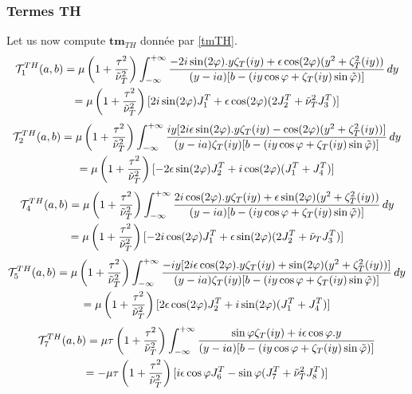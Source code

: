 \subsubsection{Termes TH}
Let us now compute $\mathbf{tm}_{TH}$ donnée par \eqref{tmTH}.
\begin{multline}
\mathcal{T}_1^{TH}(a,b)=\mu\left(1+\frac{\tau^2}{\nuti_T^2}\right)\int_{-\infty}^{+\infty} \frac{-2i\sin(2\varphi).y\zeta_T(iy)+\epsilon \cos (2\varphi)(y^2+\zeta_T^2(iy))}{(y-ia)\lbrack b-(iy\cos \varphi+ \zeta_T(iy)\sin\phiti) \rbrack} \, dy \\
\hfill=\mu\left(1+\frac{\tau^2}{\nuti_T^2}\right) \lbrack 2i\sin(2\varphi)J_1^T+\epsilon\cos(2\varphi)(2J_2^T+\nuti_T^2 J_3^T)\rbrack \hfill
\end{multline}
\begin{multline}
\mathcal{T}_2^{TH}(a,b)=\mu\left(1+\frac{\tau^2}{\nuti_T^2}\right)\int_{-\infty}^{+\infty} \frac{iy\lbrack 2i\epsilon \sin(2\varphi).y\zeta_T(iy)- \cos (2\varphi)(y^2+\zeta_T^2(iy))\rbrack}{(y-ia)\zeta_T(iy)\lbrack b-(iy\cos \varphi+ \zeta_T(iy)\sin\phiti) \rbrack} \, dy \\
\hfill= \mu\left(1+\frac{\tau^2}{\nuti_T^2}\right) \lbrack -2\epsilon\sin(2\varphi)J_2^T+i\cos(2\varphi)(J_1^T+J_4^T) \rbrack \hfill
\end{multline}
\begin{multline}
\mathcal{T}_4^{TH}(a,b)=\mu\left(1+\frac{\tau^2}{\nuti_T^2}\right)\int_{-\infty}^{+\infty} \frac{2i\cos(2\varphi).y\zeta_T(iy)+\epsilon \sin (2\varphi)(y^2+\zeta_T^2(iy))}{(y-ia)\lbrack b-(iy\cos \varphi+ \zeta_T(iy)\sin\phiti) \rbrack} \, dy \\
\hfill =\mu\left(1+\frac{\tau^2}{\nuti_T^2}\right) \lbrack -2i\cos(2\varphi)J_1^T+\epsilon \sin(2\varphi)(2J_2^T+\nuti_TJ_3^T) \rbrack \hfill
\end{multline}
\begin{multline}
\mathcal{T}_5^{TH}(a,b)=\mu\left(1+\frac{\tau^2}{\nuti_T^2}\right)\int_{-\infty}^{+\infty} \frac{-iy\lbrack 2i\epsilon \cos(2\varphi).y\zeta_T(iy)+\sin (2\varphi)(y^2+\zeta_T^2(iy))\rbrack}{(y-ia)\zeta_T(iy)\lbrack b-(iy\cos \varphi+ \zeta_T(iy)\sin\phiti) \rbrack} \, dy \\
\hfill =\mu\left(1+\frac{\tau^2}{\nuti_T^2}\right) \lbrack 2\epsilon\cos(2\varphi)J_2^T+i\sin(2\varphi)(J_1^T+J_4^T)\rbrack \hfill
\end{multline}
\begin{multline}
\mathcal{T}_7^{TH}(a,b)=\mu\tau\left(1+\frac{\tau^2}{\nuti_T^2}\right)\int_{-\infty}^{+\infty} \frac{\sin\varphi\zeta_T(iy)+i\epsilon\cos\varphi.y}{(y-ia)\lbrack b-(iy\cos \varphi+ \zeta_T(iy)\sin\phiti) \rbrack} \\
\hfill = -\mu\tau\left(1+\frac{\tau^2}{\nuti_T^2}\right)\lbrack i\epsilon\cos\varphi J_6^T-\sin\varphi(J_7^T+\nuti_T^2J_8^T)\rbrack \hfill
\end{multline}

